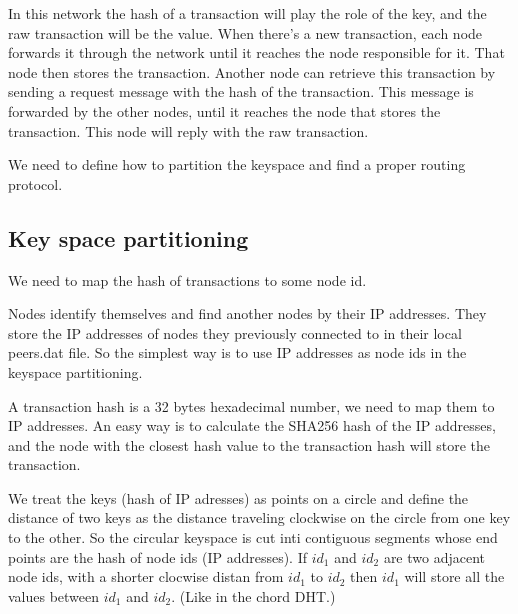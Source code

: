 \documentclass[a4paper,12pt]{article}
\begin{document}
In this network the hash of a transaction will play the role of the key, and the raw transaction will be the value. When there's a new transaction, each node forwards it through the network until it reaches the node responsible for it. That node then stores the transaction. Another node can retrieve this transaction by sending a request message with the hash of the transaction. This message is forwarded by the other nodes, until it reaches the node that stores the transaction. This node will reply with the raw transaction.


We need to define how to partition the keyspace and find a proper routing protocol.


\subsection{Key space partitioning}

We need to map the hash of transactions to some node id.

Nodes identify themselves and find another nodes by their IP addresses. They store the IP addresses of nodes they previously connected to in their local peers.dat file. So the simplest way is to use IP addresses as node ids in the keyspace partitioning.

A transaction hash is a 32 bytes hexadecimal number, we need to map them to IP addresses. An easy way is to calculate the SHA256 hash of the IP addresses, and the node with the closest hash value to the transaction hash will store the transaction.

We treat the keys (hash of IP adresses) as points on a circle and define the distance of two keys as the distance traveling clockwise on the circle from one key to the other. So the circular keyspace is cut inti contiguous segments whose end points are the hash of node ids (IP addresses). If $id_1$ and $id_2$ are two adjacent node ids, with a shorter clocwise distan from $id_1$ to $id_2$ then $id_1$ will store all the values between $id_1$ and $id_2$. (Like in the chord DHT.)
\end{document}
